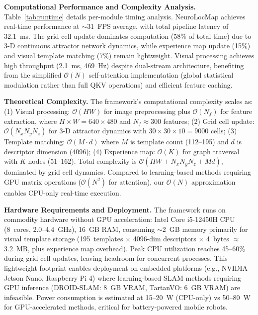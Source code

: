 \textbf{Computational Performance and Complexity Analysis.} Table~\ref{tab:runtime} details per-module timing analysis. NeuroLocMap achieves real-time per\-for\-mance at $\sim$31~FPS average, with total pipeline latency of 32.1~ms. The grid cell update dominates computation (58\% of total time) due to 3-D continuous attractor network dynamics, while experience map update (15\%) and visual template matching (7\%) remain lightweight. Visual processing achieves high throughput (2.1~ms, 469~Hz) despite dual-stream architecture, benefiting from the simplified $\mathcal{O}(N)$ self-attention implementation (global statistical modulation rather than full QKV operations) and efficient feature caching.

\textbf{Theoretical Complexity.} The framework's computational complexity scales as: (1) Visual processing: $\mathcal{O}(HW)$ for image preprocessing plus $\mathcal{O}(N_f)$ for feature extraction, where $H \times W = 640 \times 480$ and $N_f \approx 300$ features; (2) Grid cell update: $\mathcal{O}(N_x N_y N_z)$ for 3-D attractor dynamics with $30 \times 30 \times 10 = 9000$ cells; (3) Template matching: $\mathcal{O}(M \cdot d)$ where $M$ is template count (112--195) and $d$ is descriptor dimension (4096); (4) Experience map: $\mathcal{O}(K)$ for graph traversal with $K$ nodes (51--162). Total complexity is $\mathcal{O}(HW + N_x N_y N_z + Md)$, dominated by grid cell dynamics. Compared to learning-based methods requiring GPU matrix operations ($\mathcal{O}(N^2)$ for attention), our $\mathcal{O}(N)$ approximation enables CPU-only real-time execution.

\textbf{Hardware Requirements and Deployment.} The framework runs on commodity hardware without GPU acceleration: Intel Core i5-12450H CPU (8~cores, 2.0--4.4~GHz), 16~GB RAM, consuming $\sim$2~GB memory primarily for visual template storage (195~templates $\times$ 4096-dim descriptors $\times$ 4~bytes $\approx$ 3.2~MB, plus experience map overhead). Peak CPU utilization reaches 45--60\% during grid cell updates, leaving headroom for concurrent processes. This lightweight footprint enables deployment on embedded platforms (e.g., NVIDIA Jetson Nano, Raspberry Pi 4) where learning-based SLAM methods requiring GPU inference (DROID-SLAM: 8~GB VRAM, TartanVO: 6~GB VRAM) are infeasible. Power consumption is estimated at 15--20~W (CPU-only) vs 50--80~W for GPU-accelerated methods, critical for battery-powered mobile robots.


